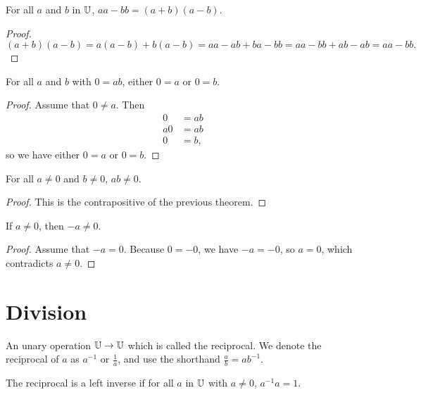 \documentclass[../math.tex]{subfiles}
\begin{document}
\begin{theorem}
    For all $a$ and $b$ in $\mathbb{U}$, $aa - bb = (a + b) (a - b)$.
\end{theorem}
\begin{proof}
    \[
        (a + b)(a - b) = a(a - b) + b(a - b) = aa - ab + ba - bb = aa - bb + ab
        - ab = aa - bb.
    \]
\end{proof}

\begin{theorem}
    For all $a$ and $b$ with $0 = ab$, either $0 = a$ or $0 = b$.
\end{theorem}
\begin{proof}
    Assume that $0 \neq a$.  Then
    \begin{align*}
        0 &= ab \\
        a0 &= ab \\
        0 &= b,
    \end{align*}
    so we have either $0 = a$ or $0 = b$.
\end{proof}

\begin{theorem} \label{mult-nz}
    For all $a \neq 0$ and $b \neq 0$, $ab \neq 0$.
\end{theorem}
\begin{proof}
    This is the contrapositive of the previous theorem.
\end{proof}

\begin{theorem}
    If $a \neq 0$, then $-a \neq 0$.
\end{theorem}
\begin{proof}
    Assume that $-a = 0$.  Because $0 = -0$, we have $-a = -0$, so $a = 0$,
    which contradicts $a \neq 0$.
\end{proof}

\section{Division}

\begin{class}
    An unary operation $\mathbb{U} \rightarrow \mathbb{U}$ which is called the reciprocal.  We
    denote the reciprocal of $a$ as $a^{-1}$ or $\frac{1}{a}$, and use the
    shorthand $\frac{a}{b} = a b^{-1}$.
\end{class}

\begin{class}
    The reciprocal is a left inverse if for all $a$ in $\mathbb{U}$ with $a \neq 0$,
    $a^{-1}a = 1$.
\end{class}
\end{document}
